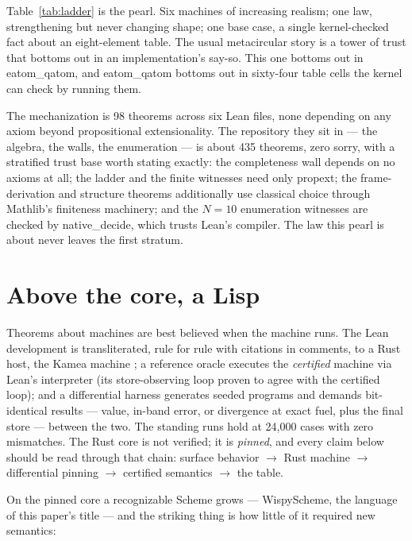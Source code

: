 \documentclass[acmsmall,screen,review]{acmart}
\begin{document}
Table~\ref{tab:ladder} is the pearl. Six machines of increasing
realism; one law, strengthening but never changing shape; one base
case, a single kernel-checked fact about an eight-element table. The
usual metacircular story is a tower of trust that bottoms out in an
implementation's say-so. This one bottoms out in
\textsf{eatom\_qatom}, and \textsf{eatom\_qatom} bottoms out in
sixty-four table cells the kernel can check by running them.

The mechanization is 98 theorems across six Lean files, none
depending on any axiom beyond propositional extensionality. The
repository they sit in --- the algebra, the walls, the enumeration
--- is about 435 theorems, zero \textsf{sorry}, with a stratified
trust base worth stating exactly: the completeness wall depends on no
axioms at all; the ladder and the finite witnesses need only
\textsf{propext}; the frame-derivation and structure theorems
additionally use classical choice through Mathlib's finiteness
machinery; and the $N\!=\!10$ enumeration witnesses are checked by
\textsf{native\_decide}, which trusts Lean's compiler. The law this
pearl is about never leaves the first stratum.

\section{Above the core, a Lisp}
\label{sec:lisp}

Theorems about machines are best believed when the machine runs. The
Lean development is transliterated, rule for rule with citations in
comments, to a Rust host, the Kamea machine \cite{artifact-rust}; a
reference oracle
executes the \emph{certified} machine via Lean's interpreter (its
store-observing loop proven to agree with the certified loop); and a
differential harness generates seeded programs and demands
bit-identical results --- value, in-band error, or divergence at
exact fuel, plus the final store --- between the two. The standing
runs hold at 24{,}000 cases with zero mismatches. The Rust core is
not verified; it is \emph{pinned}, and every claim below should be
read through that chain: surface behavior $\to$ Rust machine $\to$
differential pinning $\to$ certified semantics $\to$ the table.

On the pinned core a recognizable Scheme grows --- WispyScheme, the
language of this paper's title --- and the striking thing
is how little of it required new semantics:
\end{document}
